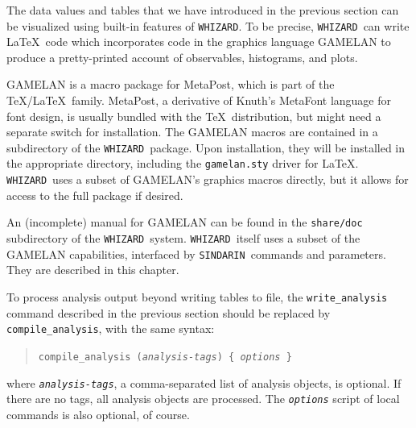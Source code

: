 \documentclass[12pt]{book}
\newcommand{\ttt}[1]{\texttt{#1}}
\newcommand{\whizard}{\ttt{WHIZARD}}
\newcommand{\sindarin}{\ttt{SINDARIN}}
\begin{document}
The data values and tables that we have introduced in the previous section can
be visualized using built-in features of \whizard.  To be precise,
\whizard\ can write \LaTeX\ code which incorporates code in the graphics
language GAMELAN to produce a pretty-printed account of observables,
histograms, and plots.

GAMELAN is a macro package for MetaPost, which is part of the
\TeX/\LaTeX\ family.  MetaPost, a derivative of Knuth's MetaFont language for
font design, is usually bundled with the \TeX\ distribution, but might need a
separate switch for installation.  The GAMELAN macros are contained in a
subdirectory of the \whizard\ package.  Upon installation, they will be
installed in the appropriate directory, including the \ttt{gamelan.sty} driver
for \LaTeX.  \whizard\ uses a subset of GAMELAN's graphics macros
directly, but it allows for access to the full package if desired.

An (incomplete) manual for GAMELAN can be found in the \ttt{share/doc}
subdirectory of the \whizard\ system.  \whizard\ itself uses a subset of the
GAMELAN capabilities, interfaced by \sindarin\ commands and parameters.  They
are described in this chapter.

To process analysis output beyond writing tables to file, the
\ttt{write\_analysis} command described in the previous section should be
replaced by \ttt{compile\_analysis}, with the same syntax:
\begin{quote}
  \begin{footnotesize}
    \ttt{compile\_analysis (\emph{analysis-tags}) \{ \ttt{\emph{options}} \}}
  \end{footnotesize}
\end{quote}
where \ttt{\emph{analysis-tags}}, a comma-separated list of analysis objects,
is optional.  If there are no tags, all analysis objects are processed.  The
\ttt{\emph{options}} script of local commands is also optional, of course.
\end{document}
